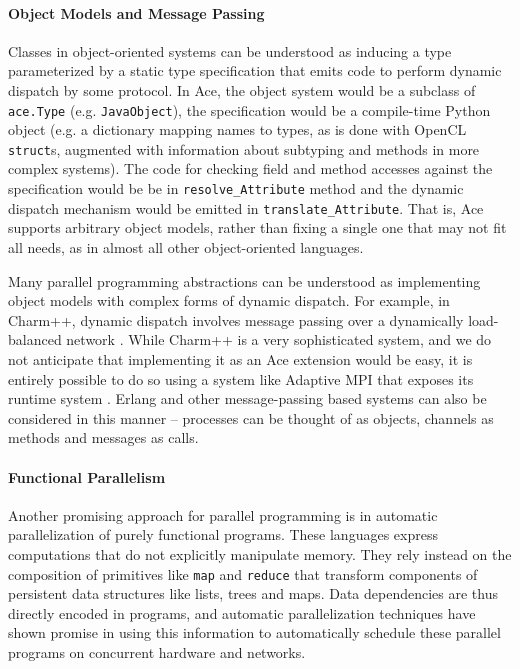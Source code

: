 \documentclass[9pt,preprint]{sigplanconf}
\begin{document}
\paragraph{Object Models and Message Passing}
Classes in object-oriented systems can be understood as inducing a type parameterized by a static type specification that emits code to perform dynamic dispatch by some protocol. In Ace, the object system would be a subclass of \verb|ace.Type| (e.g. \verb|JavaObject|), the specification would be a compile-time Python object (e.g. a dictionary mapping names to types, as is done with OpenCL \verb|struct|s, augmented with information about subtyping and methods in more complex systems). The code for checking field and method accesses against the specification would be be in \verb|resolve_Attribute| method and the dynamic dispatch mechanism would be emitted in \verb|translate_Attribute|. That is, Ace supports arbitrary object models, rather than fixing a single one that may not fit all needs, as in almost all other object-oriented languages.

Many parallel programming abstractions can be understood as implementing object models with complex forms of dynamic dispatch. For example, in Charm++, dynamic dispatch involves message passing over a dynamically load-balanced network \cite{kale1993charm++}. While Charm++ is a very sophisticated system, and we do not anticipate that implementing it as an Ace extension would be easy, it is entirely possible to do so using a system like Adaptive MPI that exposes its runtime system \cite{kale2009charm++}. Erlang and other message-passing based systems can also be considered in this manner -- processes can be thought of as objects, channels as methods and messages as calls.

\paragraph{Functional Parallelism}
Another promising approach for parallel programming is in automatic parallelization of purely functional programs. These languages express computations that do not explicitly manipulate memory. They rely instead on the composition of primitives like \verb|map| and \verb|reduce| that transform components of persistent data structures like lists, trees and maps. Data dependencies are thus directly encoded in programs, and automatic parallelization techniques have shown promise in using this information to automatically schedule these parallel programs on concurrent hardware and networks.
\end{document}
